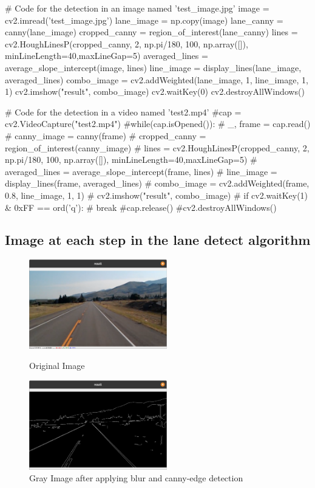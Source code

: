 \begin{appendices}
\begin{python}
# Code for the detection in an image named 'test_image.jpg'
image = cv2.imread('test_image.jpg')
lane_image = np.copy(image)
lane_canny = canny(lane_image)
cropped_canny = region_of_interest(lane_canny)
lines = cv2.HoughLinesP(cropped_canny, 2, np.pi/180, 100, np.array([]), minLineLength=40,maxLineGap=5)
averaged_lines = average_slope_intercept(image, lines)
line_image = display_lines(lane_image, averaged_lines)
combo_image = cv2.addWeighted(lane_image, 1, line_image, 1, 1)
cv2.imshow("result", combo_image)
cv2.waitKey(0)
cv2.destroyAllWindows()

# Code for the detection in a video named 'test2.mp4'
#cap = cv2.VideoCapture("test2.mp4")
#while(cap.isOpened()):
#    _, frame = cap.read()
#    canny_image = canny(frame)
#    cropped_canny = region_of_interest(canny_image)
#    lines = cv2.HoughLinesP(cropped_canny, 2, np.pi/180, 100, np.array([]), minLineLength=40,maxLineGap=5)
#    averaged_lines = average_slope_intercept(frame, lines)
#    line_image = display_lines(frame, averaged_lines)
#    combo_image = cv2.addWeighted(frame, 0.8, line_image, 1, 1)
#    cv2.imshow("result", combo_image)
#    if cv2.waitKey(1) & 0xFF == ord('q'):
#        break
#cap.release()
#cv2.destroyAllWindows()
\end{python}
\clearpage

\subsection{Image at each step in the lane detect algorithm}
\label{imagelaneDetect}
\begin{figure}[!h]
\begin{minipage}{7cm}
\centering
\includegraphics[width=6cm]{img/lane_detect/lane_img.png}
\caption{Original Image}
\end{minipage}
\hspace*{1cm}
\begin{minipage}{7cm}
\centering
\includegraphics[width=6cm]{img/lane_detect/canny_img.png}
\caption{Gray Image after applying blur and canny-edge detection}
\end{minipage}
\end{figure}


\end{appendices}

